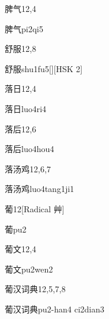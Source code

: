 \begin{entry}{脾气}{12,4}
  \begin{phonetics}{脾气}{pi2qi5}
  \end{phonetics}
\end{entry}

\begin{entry}{舒服}{12,8}
  \begin{phonetics}{舒服}{shu1fu5}[][HSK 2]
  \end{phonetics}
\end{entry}

\begin{entry}{落日}{12,4}
  \begin{phonetics}{落日}{luo4ri4}
  \end{phonetics}
\end{entry}

\begin{entry}{落后}{12,6}
  \begin{phonetics}{落后}{luo4hou4}
  \end{phonetics}
\end{entry}

\begin{entry}{落汤鸡}{12,6,7}
  \begin{phonetics}{落汤鸡}{luo4tang1ji1}
  \end{phonetics}
\end{entry}

\begin{entry}{葡}{12}[Radical 艸]
  \begin{phonetics}{葡}{pu2}
  \end{phonetics}
\end{entry}

\begin{entry}{葡文}{12,4}
  \begin{phonetics}{葡文}{pu2wen2}
  \end{phonetics}
\end{entry}

\begin{entry}{葡汉词典}{12,5,7,8}
  \begin{phonetics}{葡汉词典}{pu2-han4 ci2dian3}
  \end{phonetics}
\end{entry}

